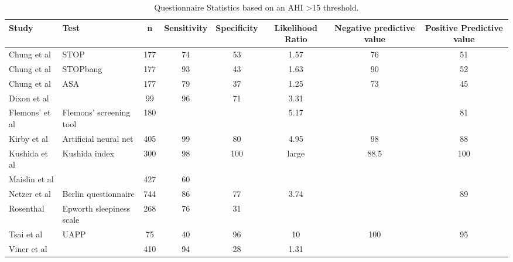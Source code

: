 \begin{table}[h]
\centering
\begin{tabular}{l l c c c c c c}
\toprule
Study&Test&n&Sensitivity&Specificity&Likelihood Ratio&Negative predictive value&Positive Predictive value\\ \midrule
Chung et al&STOP&177&74&53&1.57&76&51\\ 
Chung et al&STOPbang&177&93&43&1.63&90&52\\ 
Chung et al&ASA&177&79&37&1.25&73&45\\ 
Dixon et al&&99&96&71&3.31&&\\ 
Flemons' et al&Flemons' screening tool&180&&&5.17&&81\\ 
Kirby et al&Artificial neural net&405&99&80&4.95&98&88\\ 
Kushida et al&Kushida index&300&98&100&large&88.5&100\\ 
Maislin et al&&427&60&&&&\\ 
Netzer et al&Berlin questionnaire&744&86&77&3.74&&89\\ 
Rosenthal&Epworth sleepiness scale&268&76&31&&&\\ 
Tsai et al&UAPP&75&40&96&10&100&95\\ 
Viner et al&&410&94&28&1.31&&\\ \bottomrule
\end{tabular}
\caption{Questionnaire Statistics based on an AHI >15 threshold.}
\label{table:questionnaire}
\end{table}

